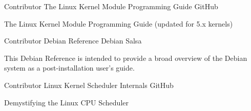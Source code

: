 

\begin{cventries}

  \cventry
  {Contributor} %
  {The Linux Kernel Module Programming Guide} %
  {GitHub} %
  {} %
  {
    \begin{cvitems} %
      \item {The Linux Kernel Module Programming Guide (updated for 5.x kernels)}
    \end{cvitems}
  }

  \cventry
  {Contributor} %
  {Debian Reference} %
  {Debian Salsa} %
  {} %
  {
    \begin{cvitems} %
      \item {This Debian Reference is intended to provide a broad overview of the Debian system as a post-installation user's guide.}
    \end{cvitems}
  }

  \cventry
  {Contributor}
  {Linux Kernel Scheduler Internals}
  {GitHub}
  {}
  {
	  \begin{cvitems}
      \item {Demystifying the Linux CPU Scheduler}
	  \end{cvitems}
  }

\end{cventries}

